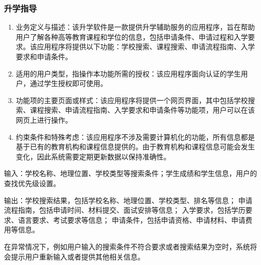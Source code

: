 \documentclass[UTF8]{ctexart}
\newcommand{\ch}[1]{\textcolor{ChatGPT}{#1}}
\newcommand{\m}[1]{\textcolor{modify}{#1}}
\begin{document}
    \subsubsection{升学指导}
    \begin{enumerate}
        \item 业务定义与描述：\ch{该升学软件是一款提供升学辅助服务的应用程序，旨在帮助用户了解各种高等教育课程和学位的信息，包括申请条件、申请过程和入学要求。该应用程序将提供以下功能：学校搜索、课程搜索、申请流程指南、入学要求和申请条件。}
        \item 适用的用户类型，指操作本功能所需的授权：该应用程序面向认证的学生用户，通过学生授权即可使用。
        \item 功能项的主要页面或样式：该应用程序将提供一个网页界面，其中包括学校搜索、课程搜索、申请流程指南、入学要求和申请条件等功能项，用户可以在该网页上进行操作。
        \item 约束条件和特殊考虑：该应用程序不涉及需要计算机化的功能，所有信息都是基于已有的教育机构和课程信息提供的。由于教育机构和课程信息可能会发生变化，因此系统需要定期更新数据以保持准确性。
    \end{enumerate}
    \par
    输入：学校名称、地理位置、学校类型等搜索条件；学生成绩和学生信息，用户的查找优先级设置。
    \par
    输出：\m{学校搜索结果，包括学校名称、地理位置、学校类型、排名等信息；
    申请流程指南，包括申请时间、材料提交、面试安排等信息；
    入学要求，包括学历要求、语言要求、考试要求等信息；
    申请条件，包括申请资格、申请材料、申请费用等信息。}

    \par
    \m{在异常情况下，例如用户输入的搜索条件不符合要求或者搜索结果为空时，系统将会提示用户重新输入或者提供其他相关信息。}
\end{document}

